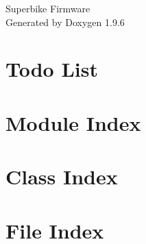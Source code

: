 \documentclass[twoside]{book}
\newcommand{\+}{\discretionary{\mbox{\scriptsize$\hookleftarrow$}}{}{}}
\newcommand{\clearemptydoublepage}{%
    \newpage{\pagestyle{empty}\cleardoublepage}%
  }
\begin{document}
  \raggedbottom
    \hypersetup{pageanchor=false,
                bookmarksnumbered=true,
                pdfencoding=unicode
               }
  \begin{titlepage}
  \vspace*{7cm}
  \begin{center}%
  {\Large Superbike Firmware}\\
  \vspace*{1cm}
  {\large Generated by Doxygen 1.9.6}\\
  \end{center}
  \end{titlepage}
  \clearemptydoublepage
  \tableofcontents
  \clearemptydoublepage
  \hypersetup{pageanchor=true}
\chapter{Todo List}
\label{todo}

\chapter{Module Index}

\chapter{Class Index}

\chapter{File Index}

\end{document}
